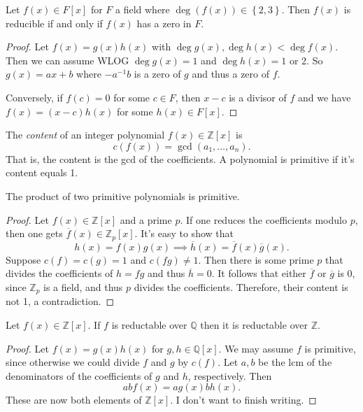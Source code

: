 \begin{proposition}\label{prp:idk}
	Let $f(x)\in F[x]$ for $F$ a field where $\operatorname{deg} (f(x))\in \left\{ 2,3 \right\} $. Then $f(x)$ is reducible if and only if $f(x)$ has a zero in $F$.
\end{proposition}
\begin{proof}
	Let $f(x)=g(x)h(x)$ with $\operatorname{deg} g(x), \operatorname{deg} h(x)<\operatorname{deg} f(x)$. Then we can assume WLOG $\operatorname{deg} g(x)=1$ and $\operatorname{deg} h(x)=1$ or 2. So $g(x)=ax+b$ where $-a^{-1} b$ is a zero of $g$ and thus a zero of $f$.

	Conversely, if $f(c)=0$ for some $c\in F$, then $x-c$ is a divisor of $f$ and we have $f(x)=(x-c)h(x)$ for some $h(x)\in F[x]$.
\end{proof}
\begin{definition}[Content]\label{dfn:1.14}
	The \emph{content} of an integer polynomial $f(x)\in\mathbb{Z} [x]$ is
	\[
		c(f(x))=\operatorname{gcd} \left( a_1, \ldots, a_n  \right) 
	.\]
	That is, the content is the gcd of the coefficients. A polynomial is primitive if it's content equals 1.
\end{definition}
\begin{lemma}\label{lma:1.5}
	The product of two primitive polynomials is primitive.
\end{lemma}
\begin{proof}
	Let $f(x)\in\mathbb{Z} [x]$ and a prime $p$. If one reduces the coefficients modulo $p$, then one gets $\overline{f} (x)\in \mathbb{Z} _p[x]$. It's easy to show that
	\[
		h(x)=f(x)g(x)\implies \overline{h}(x)=\overline{f}(x) \overline{g} (x)
	.\]
	Suppose $c(f)=c(g)=1$ and $c(fg)\neq 1$. Then there is some prime $p$ that divides the coefficients of $h=fg$ and thus $\overline{h} =0$. It follows that either $\overline{f}$ or $\overline{g} $ is 0, since $\mathbb{Z} _p$ is a field, and thus $p$ divides the coefficients. Therefore, their content is not 1, a contradiction.
\end{proof}
\begin{theorem}\label{thm:1.3}
	Let $f(x)\in \mathbb{Z} [x]$. If $f$ is reductable over $\mathbb{Q} $ then it is reductable over $\mathbb{Z} $.
\end{theorem}
\begin{proof}
	Let $f(x)=g(x)h(x)$ for $g,h\in \mathbb{Q} [x]$. We may assume $f$ is primitive, since otherwise we could divide $f$ and $g$ by $c(f)$. Let $a,b$ be the lcm of the denominators of the coefficients of $g$ and $h$, respectively. Then
	\[
		a b f(x)=ag(x)bh(x)
	.\]
	These are now both elements of $\mathbb{Z} [x]$. I don't want to finish writing.
\end{proof}
